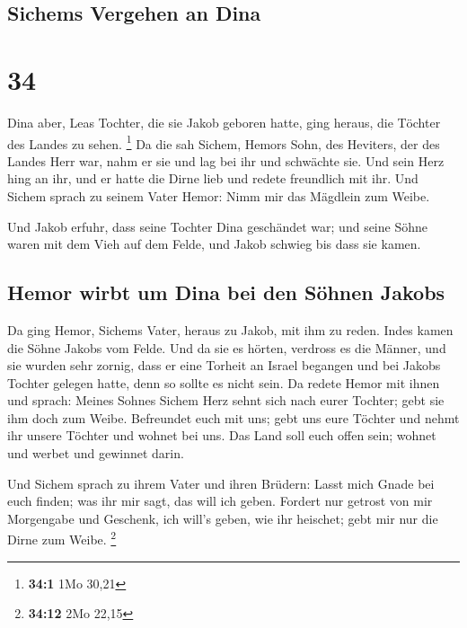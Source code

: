 \hypertarget{sichems-vergehen-an-dina}{%
\subsection{Sichems Vergehen an Dina}\label{sichems-vergehen-an-dina}}

\hypertarget{section-33}{%
\section{34}\label{section-33}}

 Dina aber, Leas Tochter, die sie Jakob geboren hatte,
ging heraus, die Töchter des Landes zu sehen. \footnote{\textbf{34:1}
  1Mo 30,21}  Da die sah Sichem, Hemors Sohn, des
Heviters, der des Landes Herr war, nahm er sie und lag bei ihr und
schwächte sie.  Und sein Herz hing an ihr, und er hatte
die Dirne lieb und redete freundlich mit ihr.  Und Sichem
sprach zu seinem Vater Hemor: Nimm mir das Mägdlein zum Weibe.

 Und Jakob erfuhr, dass seine Tochter Dina geschändet war;
und seine Söhne waren mit dem Vieh auf dem Felde, und Jakob schwieg bis
dass sie kamen.

\hypertarget{hemor-wirbt-um-dina-bei-den-suxf6hnen-jakobs}{%
\subsection{Hemor wirbt um Dina bei den Söhnen
Jakobs}\label{hemor-wirbt-um-dina-bei-den-suxf6hnen-jakobs}}

 Da ging Hemor, Sichems Vater, heraus zu Jakob, mit ihm zu
reden.  Indes kamen die Söhne Jakobs vom Felde. Und da sie
es hörten, verdross es die Männer, und sie wurden sehr zornig, dass er
eine Torheit an Israel begangen und bei Jakobs Tochter gelegen hatte,
denn so sollte es nicht sein.  Da redete Hemor mit ihnen
und sprach: Meines Sohnes Sichem Herz sehnt sich nach eurer Tochter;
gebt sie ihm doch zum Weibe.  Befreundet euch mit uns;
gebt uns eure Töchter und nehmt ihr unsere Töchter  und
wohnet bei uns. Das Land soll euch offen sein; wohnet und werbet und
gewinnet darin.

 Und Sichem sprach zu ihrem Vater und ihren Brüdern:
Lasst mich Gnade bei euch finden; was ihr mir sagt, das will ich geben.
 Fordert nur getrost von mir Morgengabe und Geschenk, ich
will's geben, wie ihr heischet; gebt mir nur die Dirne zum Weibe.
\footnote{\textbf{34:12} 2Mo 22,15}

